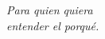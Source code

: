 \begin{pagina}
\thispagestyle{empty}
\vspace*{0.3\textheight}
\begin{flushright}
\itshape
Para quien quiera\\
entender el porqué.
\end{flushright}
\vfill
\end{pagina}
